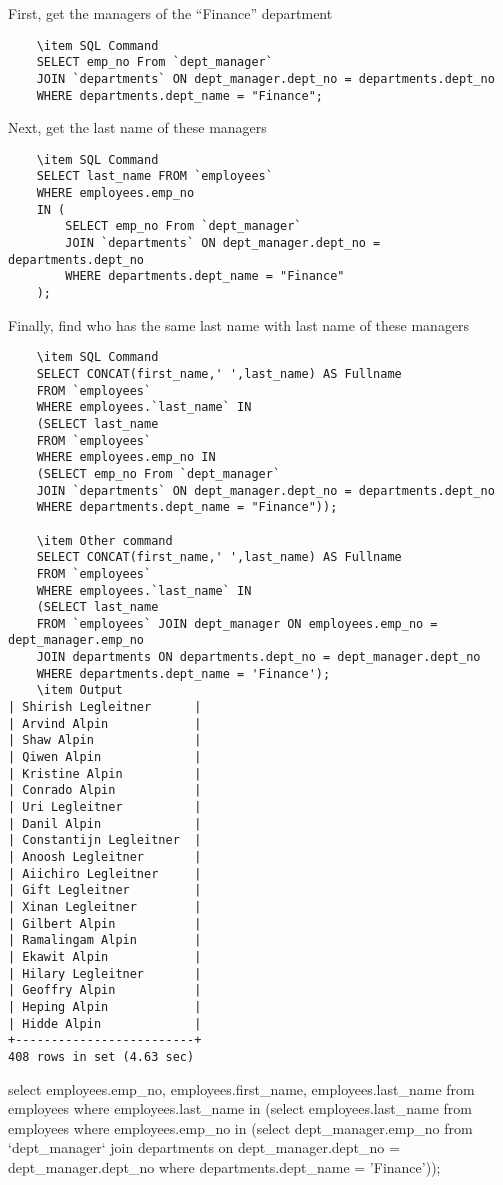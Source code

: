 \documentclass[13pt,a4paper]{report}
\begin{document}
\begin{itemize}
First, get the managers of the “Finance” department
\begin{lstlisting}
	\item SQL Command
	SELECT emp_no From `dept_manager` 
	JOIN `departments` ON dept_manager.dept_no = departments.dept_no 
	WHERE departments.dept_name = "Finance";
\end{lstlisting}
Next, get the last name of these managers
\begin{lstlisting}
	\item SQL Command
	SELECT last_name FROM `employees` 
	WHERE employees.emp_no 
	IN (
		SELECT emp_no From `dept_manager` 
		JOIN `departments` ON dept_manager.dept_no = departments.dept_no 
		WHERE departments.dept_name = "Finance"
	);
\end{lstlisting}
Finally, find who has the same last name with last name of these managers
\begin{lstlisting}
	\item SQL Command
	SELECT CONCAT(first_name,' ',last_name) AS Fullname
	FROM `employees`
	WHERE employees.`last_name` IN 
	(SELECT last_name
	FROM `employees`
	WHERE employees.emp_no IN 
	(SELECT emp_no From `dept_manager`
	JOIN `departments` ON dept_manager.dept_no = departments.dept_no
	WHERE departments.dept_name = "Finance"));
	
	\item Other command
	SELECT CONCAT(first_name,' ',last_name) AS Fullname 
	FROM `employees` 
	WHERE employees.`last_name` IN 
	(SELECT last_name 
	FROM `employees` JOIN dept_manager ON employees.emp_no = dept_manager.emp_no
	JOIN departments ON departments.dept_no = dept_manager.dept_no
	WHERE departments.dept_name = 'Finance');
	\item Output
| Shirish Legleitner      |
| Arvind Alpin            |
| Shaw Alpin              |
| Qiwen Alpin             |
| Kristine Alpin          |
| Conrado Alpin           |
| Uri Legleitner          |
| Danil Alpin             |
| Constantijn Legleitner  |
| Anoosh Legleitner       |
| Aiichiro Legleitner     |
| Gift Legleitner         |
| Xinan Legleitner        |
| Gilbert Alpin           |
| Ramalingam Alpin        |
| Ekawit Alpin            |
| Hilary Legleitner       |
| Geoffry Alpin           |
| Heping Alpin            |
| Hidde Alpin             |
+-------------------------+
408 rows in set (4.63 sec)

\end{lstlisting}

select employees.emp_no, employees.first_name, employees.last_name from employees where employees.last_name in (select employees.last_name from employees where employees.emp_no in (select dept_manager.emp_no from `dept_manager` join departments on dept_manager.dept_no = dept_manager.dept_no where departments.dept_name = 'Finance'));

\end{itemize}
\end{document}

